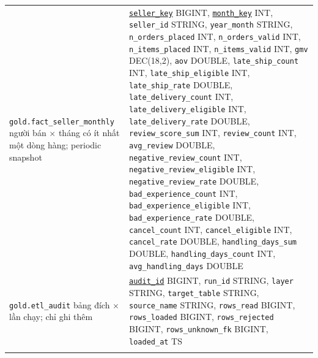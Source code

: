 \documentclass[a4paper]{article}
\begin{document}
{\begin{longtable}{@{}>{\raggedright\arraybackslash}p{3.6cm}>{\raggedright\arraybackslash}p{12.6cm}@{}}
\texttt{gold.fact\_\allowbreak{}seller\_\allowbreak{}monthly} \newline 1 người bán $\times$ tháng có ít nhất một dòng hàng; periodic snapshot & \underline{\texttt{seller\_\allowbreak{}key}} BIGINT, \underline{\texttt{month\_\allowbreak{}key}} INT, \texttt{seller\_\allowbreak{}id} STRING, \texttt{year\_\allowbreak{}month} STRING, \texttt{n\_\allowbreak{}orders\_\allowbreak{}placed} INT, \texttt{n\_\allowbreak{}orders\_\allowbreak{}valid} INT, \texttt{n\_\allowbreak{}items\_\allowbreak{}placed} INT, \texttt{n\_\allowbreak{}items\_\allowbreak{}valid} INT, \texttt{gmv} DEC(18,2), \texttt{aov} DOUBLE, \texttt{late\_\allowbreak{}ship\_\allowbreak{}count} INT, \texttt{late\_\allowbreak{}ship\_\allowbreak{}eligible} INT, \texttt{late\_\allowbreak{}ship\_\allowbreak{}rate} DOUBLE, \texttt{late\_\allowbreak{}delivery\_\allowbreak{}count} INT, \texttt{late\_\allowbreak{}delivery\_\allowbreak{}eligible} INT, \texttt{late\_\allowbreak{}delivery\_\allowbreak{}rate} DOUBLE, \texttt{review\_\allowbreak{}score\_\allowbreak{}sum} INT, \texttt{review\_\allowbreak{}count} INT, \texttt{avg\_\allowbreak{}review} DOUBLE, \texttt{negative\_\allowbreak{}review\_\allowbreak{}count} INT, \texttt{negative\_\allowbreak{}review\_\allowbreak{}eligible} INT, \texttt{negative\_\allowbreak{}review\_\allowbreak{}rate} DOUBLE, \texttt{bad\_\allowbreak{}experience\_\allowbreak{}count} INT, \texttt{bad\_\allowbreak{}experience\_\allowbreak{}eligible} INT, \texttt{bad\_\allowbreak{}experience\_\allowbreak{}rate} DOUBLE, \texttt{cancel\_\allowbreak{}count} INT, \texttt{cancel\_\allowbreak{}eligible} INT, \texttt{cancel\_\allowbreak{}rate} DOUBLE, \texttt{handling\_\allowbreak{}days\_\allowbreak{}sum} DOUBLE, \texttt{handling\_\allowbreak{}days\_\allowbreak{}count} INT, \texttt{avg\_\allowbreak{}handling\_\allowbreak{}days} DOUBLE \\
\addlinespace
\texttt{gold.etl\_\allowbreak{}audit} \newline 1 bảng đích $\times$ lần chạy; chỉ ghi thêm & \underline{\texttt{audit\_\allowbreak{}id}} BIGINT, \texttt{run\_\allowbreak{}id} STRING, \texttt{layer} STRING, \texttt{target\_\allowbreak{}table} STRING, \texttt{source\_\allowbreak{}name} STRING, \texttt{rows\_\allowbreak{}read} BIGINT, \texttt{rows\_\allowbreak{}loaded} BIGINT, \texttt{rows\_\allowbreak{}rejected} BIGINT, \texttt{rows\_\allowbreak{}unknown\_\allowbreak{}fk} BIGINT, \texttt{loaded\_\allowbreak{}at} TS \\
\addlinespace
\midrule

\end{longtable}}
\end{document}

